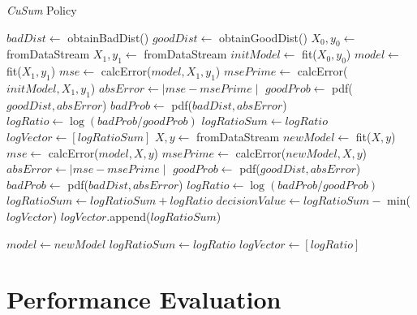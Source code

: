 \documentclass{mpaper}
\begin{document}
\begin{algorithm}[!h]
\caption{\textit{CuSum} Policy}\label{polCusum}
\begin{algorithmic}
\State $badDist \gets$ obtainBadDist() 
\State $goodDist \gets$ obtainGoodDist() 
\State $X_0, y_0 \gets$ fromDataStream
\State $X_1, y_1 \gets$ fromDataStream
\State $initModel \gets$ fit($X_0, y_0$)
\State $model \gets$ fit($X_1, y_1$)
\State $mse \gets$ calcError($model,X_1,y_1$)
\State $msePrime \gets$ calcError($initModel,X_1,y_1$)
\State $absError \gets \mid mse - msePrime \mid$
\State $goodProb \gets$ pdf($goodDist,absError$)
\State $badProb \gets$ pdf($badDist,absError$)
\State $logRatio \gets \log(badProb/goodProb)$
\State $logRatioSum \gets logRatio$
\State $logVector \gets [logRatioSum]$
    \State $X, y \gets$ fromDataStream
    \State $newModel \gets$ fit($X,y$)
    \State $mse \gets$ calcError($model,X,y$)
    \State $msePrime \gets$ calcError($newModel,X,y$)
    \State $absError \gets \mid mse - msePrime \mid$
    \State $goodProb \gets$ pdf($goodDist, absError$)
    \State $badProb \gets$ pdf($badDist, absError$)
    \State $logRatio \gets \log(badProb/goodProb)$
    \State $logRatioSum \gets logRatioSum + logRatio$
    \State $decisionValue \gets logRatioSum - $ min($logVector$)
    \State $logVector$.append($logRatioSum$)

        \State $model \gets newModel$ 
        \State $logRatioSum \gets logRatio$
        \State $logVector \gets [logRatio]$
    \EndIf
\EndWhile
\end{algorithmic}
\end{algorithm}

\section{Performance Evaluation}
\end{document}
